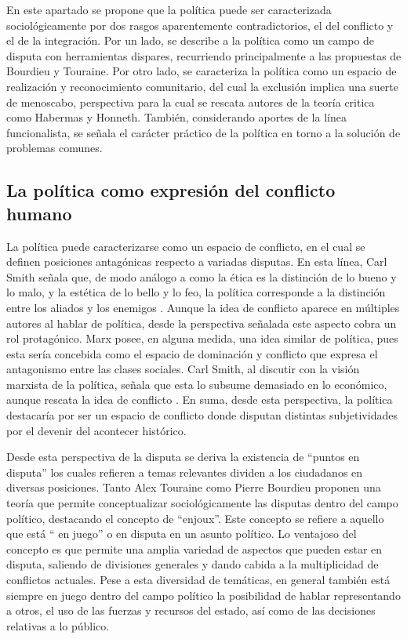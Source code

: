 \documentclass[12pt,twoside]{templates/facsothesis}
\begin{document}
En este apartado se propone que la política puede ser caracterizada sociológicamente por dos rasgos aparentemente contradictorios, el del conflicto y el de la integración. Por un lado, se describe a la política como un campo de disputa con herramientas dispares, recurriendo principalmente a las propuestas de Bourdieu y Touraine. Por otro lado, se caracteriza la política como un espacio de realización y reconocimiento comunitario, del cual la exclusión implica una suerte de menoscabo, perspectiva para la cual se rescata autores de la teoría critica como Habermas y Honneth. También, considerando aportes de la línea funcionalista, se señala el carácter práctico de la política en torno a la solución de problemas comunes.

\hypertarget{la-poluxedtica-como-expresiuxf3n-del-conflicto-humano}{%
\subsection{La política como expresión del conflicto humano}\label{la-poluxedtica-como-expresiuxf3n-del-conflicto-humano}}

La política puede caracterizarse como un espacio de conflicto, en el cual se definen posiciones antagónicas respecto a variadas disputas. En esta línea, Carl Smith señala que, de modo análogo a como la ética es la distinción de lo bueno y lo malo, y la estética de lo bello y lo feo, la política corresponde a la distinción entre los aliados y los enemigos \citep{schmitt_concept_1996}. Aunque la idea de conflicto aparece en múltiples autores al hablar de política, desde la perspectiva señalada este aspecto cobra un rol protagónico. Marx posee, en alguna medida, una idea similar de política, pues esta sería concebida como el espacio de dominación y conflicto que expresa el antagonismo entre las clases sociales. Carl Smith, al discutir con la visión marxista de la política, señala que esta lo subsume demasiado en lo económico, aunque rescata la idea de conflicto \citep{paredes_Marx_2018}. En suma, desde esta perspectiva, la política destacaría por ser un espacio de conflicto donde disputan distintas subjetividades por el devenir del acontecer histórico.

Desde esta perspectiva de la disputa se deriva la existencia de ``puntos en disputa'' los cuales refieren a temas relevantes dividen a los ciudadanos en diversas posiciones. Tanto Alex Touraine como Pierre Bourdieu proponen una teoría que permite conceptualizar sociológicamente las disputas dentro del campo político, destacando el concepto de ``enjoux''. Este concepto se refiere a aquello que está `` en juego'' o en disputa en un asunto político. Lo ventajoso del concepto es que permite una amplia variedad de aspectos que pueden estar en disputa, saliendo de divisiones generales y dando cabida a la multiplicidad de conflictos actuales. Pese a esta diversidad de temáticas, en general también está siempre en juego dentro del campo político la posibilidad de hablar representando a otros, el uso de las fuerzas y recursos del estado, así como de las decisiones relativas a lo público.
\end{document}
